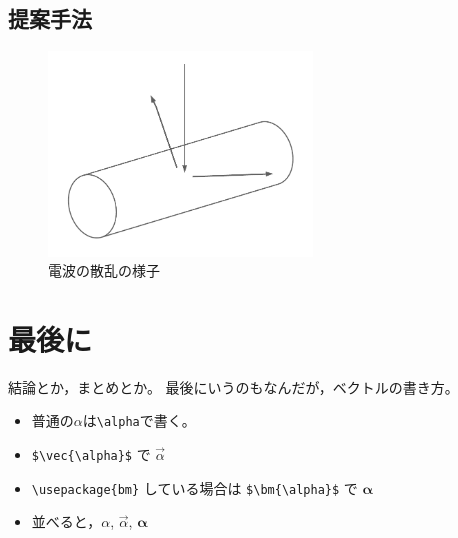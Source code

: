\documentclass[a4paper,12pt]{jsreport}
\begin{document}
\section{提案手法}

\begin{figure}[h]
  \begin{center}
   \includegraphics[width=7cm]{./image/scattering.pdf}
  \caption{電波の散乱の様子}\label{電波の散乱の様子}
  \end{center}
  \end{figure}



\chapter{最後に}

結論とか，まとめとか。
最後にいうのもなんだが，ベクトルの書き方。
\begin{itemize}
\item 普通の$\alpha$は\verb|\alpha|で書く。
\item \verb|$\vec{\alpha}$| で $\vec{\alpha}$
\item \verb|\usepackage{bm}| している場合は
\verb|$\bm{\alpha}$| で $\bm{\alpha}$
\item 並べると，$\alpha$, $\vec{\alpha}$, $\bm{\alpha}$
\end{itemize}
\end{document}
